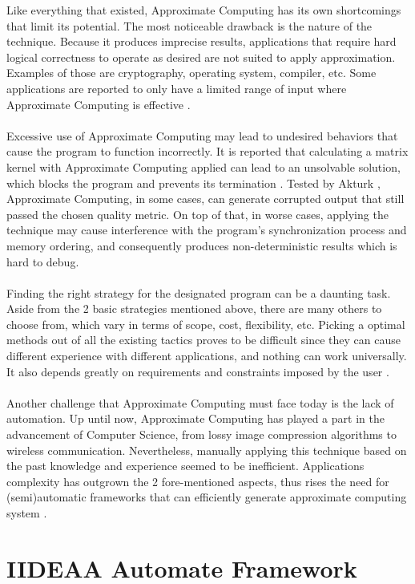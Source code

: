 Like everything that existed, Approximate Computing has its own shortcomings that limit its potential. The most noticeable drawback is the nature of the technique. Because it produces imprecise results, applications that require hard logical correctness to operate as desired are not suited to apply approximation. Examples of those are cryptography, operating system, compiler, etc. Some applications are reported to only have a limited range of input where Approximate Computing is effective \cite{AxCSurvey}. \\
~\\
Excessive use of Approximate Computing may lead to undesired behaviors that cause the program to function incorrectly. It is reported that calculating a matrix kernel with Approximate Computing applied can lead to an unsolvable solution, which blocks the program and prevents its termination \cite{AxCSurvey}. Tested by Akturk \cite{Akturk2015OnQO}, Approximate Computing, in some cases, can generate corrupted output that still passed the chosen quality metric. On top of that, in worse cases, applying the technique may cause interference with the program's synchronization process and memory ordering, and consequently produces non-deterministic results which is hard to debug.\\
~\\
Finding the right strategy for the designated program can be a daunting task. Aside from the 2 basic strategies mentioned above, there are many others to choose from, which vary in terms of scope, cost, flexibility, etc. Picking a optimal methods out of all the existing tactics proves to be difficult since they can cause different experience with different applications, and nothing can work universally. It also depends greatly on requirements and constraints imposed by the user \cite{Ansel}. \\
~\\
Another challenge that Approximate Computing must face today is the lack of automation. Up until now, Approximate Computing has played a part in the advancement of Computer Science, from lossy image compression algorithms to wireless communication. Nevertheless, manually applying this technique based on the past knowledge and experience seemed to be inefficient. Applications complexity has outgrown the 2 fore-mentioned aspects, thus rises the need for (semi)automatic frameworks that can efficiently generate approximate computing system \cite{introAxC}. \\

\section{IIDEAA Automate Framework} 


